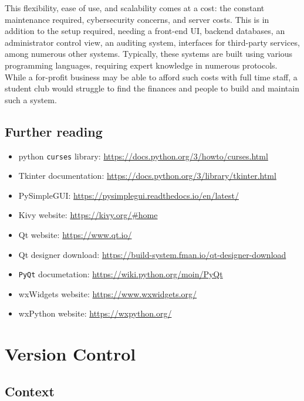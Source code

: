 \documentclass[11pt]{article}
\begin{document}
This flexibility, ease of use, and scalability comes at a cost: the constant maintenance required, cybersecurity concerns, and \gls{server} costs. This is in addition to the setup required, needing a front-end UI, backend databases, an administrator control view, an auditing system, interfaces for third-party services, among numerous other systems. Typically, these systems are built using various programming languages, requiring expert knowledge in numerous protocols. While a for-profit business may be able to afford such costs with full time staff, a student club would struggle to find the finances and people to build and maintain such a system.

\subsection{Further reading}

\begin{itemize}
    \item \Gls{python} \texttt{curses} \gls{library}: \url{https://docs.python.org/3/howto/curses.html}
    \item Tkinter documentation: \url{https://docs.python.org/3/library/tkinter.html}
    \item PySimpleGUI: \url{https://pysimplegui.readthedocs.io/en/latest/}
    \item Kivy website: \url{https://kivy.org/#home}
    \item Qt website: \url{https://www.qt.io/}
    \item Qt designer download: \url{https://build-system.fman.io/qt-designer-download}
    \item \texttt{PyQt} documetation: \url{https://wiki.python.org/moin/PyQt}
    \item wxWidgets website: \url{https://www.wxwidgets.org/}
    \item wxPython website: \url{https://wxpython.org/}
\end{itemize}

\newpage

\section{Version Control}

\subsection{Context}
\end{document}
